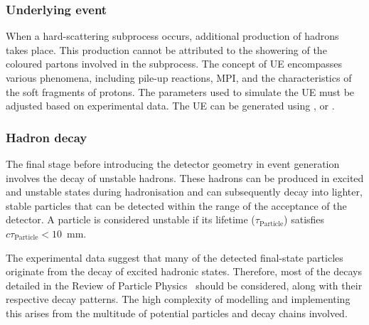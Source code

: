 \subsubsection{Underlying event}
When a hard-scattering subprocess occurs, additional production of hadrons takes place. 
This production cannot be attributed to the showering of the coloured partons involved in the subprocess. 
The concept of UE encompasses various phenomena, 
including pile-up reactions, MPI, and the characteristics of the soft fragments of protons.
The parameters used to simulate the UE must be adjusted based on experimental data.
The UE can be generated using \Herwig, \Pythia or \Sherpa.




\subsubsection{Hadron decay}
\label{sec:Chap3.1:MC:Steps:HadronDecay}
The final stage before introducing the detector geometry in event generation involves 
the decay of unstable hadrons.  
These hadrons can be produced in excited and unstable states during hadronisation 
and can subsequently decay into lighter, stable particles that can be detected within 
the range of the acceptance of the detector. A particle is considered unstable if 
its lifetime ($\tau_{\text{Particle}}$) satisfies $c\tau_{\text{Particle}} < 10$~mm. 

The experimental data suggest that many of the detected final-state particles 
originate from the decay of excited hadronic states. Therefore, most of the decays 
detailed in the Review of Particle Physics~\cite{Workman:2022ynf} should 
be considered, along with their respective decay patterns.
The high complexity of modelling and implementing 
this arises from the multitude of potential particles and decay chains involved.

\begin{comment}
\subsubsection{\P tau decay}
Given the short lifetime of the \Ptau lepton 
($2.9 \times 10^{-13}$~s), it is also considered unstable and, hence, its decays are generated 
within the MC event simulation chain. The matrix elements of the \Ptau decay are
integral part of the simulation chain.

\subsubsection{Top-quark and Higgs-boson decay}
The decay of the top quark and the Higgs boson is also a fundamental 
Done with madspin <- this conserves the spin information which is not explicitly used in
the \tHq search but it is relevant for other top analyses such as the measure of polarisation.
\end{comment}


